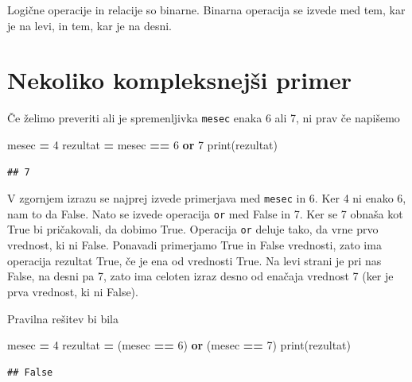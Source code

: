 \documentclass[
]{book}
\newenvironment{Shaded}{\begin{snugshade}}{\end{snugshade}}
\newcommand{\BuiltInTok}[1]{#1}
\newcommand{\DecValTok}[1]{\textcolor[rgb]{0.00,0.00,0.81}{#1}}
\newcommand{\KeywordTok}[1]{\textcolor[rgb]{0.13,0.29,0.53}{\textbf{#1}}}
\newcommand{\NormalTok}[1]{#1}
\newcommand{\OperatorTok}[1]{\textcolor[rgb]{0.81,0.36,0.00}{\textbf{#1}}}
\begin{document}
Logične operacije in relacije so binarne. Binarna operacija se izvede med tem,
kar je na levi, in tem, kar je na desni.

\hypertarget{nekoliko-kompleksnejux161i-primer}{%
\section{Nekoliko kompleksnejši primer}\label{nekoliko-kompleksnejux161i-primer}}

Če želimo preveriti ali je spremenljivka \texttt{mesec} enaka 6 ali 7, ni prav če napišemo

\begin{Shaded}
\begin{Highlighting}[]
\NormalTok{mesec }\OperatorTok{=} \DecValTok{4}
\NormalTok{rezultat }\OperatorTok{=}\NormalTok{ mesec }\OperatorTok{==} \DecValTok{6} \KeywordTok{or} \DecValTok{7}
\BuiltInTok{print}\NormalTok{(rezultat)}
\end{Highlighting}
\end{Shaded}

\begin{verbatim}
## 7
\end{verbatim}

V zgornjem izrazu se najprej izvede primerjava med \texttt{mesec} in 6. Ker 4 ni enako 6,
nam to da False. Nato se izvede operacija \texttt{or} med False in 7. Ker se 7 obnaša
kot True bi pričakovali, da dobimo True. Operacija \texttt{or} deluje tako, da vrne prvo
vrednost, ki ni False. Ponavadi primerjamo True in False vrednosti, zato ima
operacija rezultat True, če je ena od vrednosti True.
Na levi strani je pri nas False, na desni pa 7, zato ima celoten izraz desno
od enačaja vrednost 7 (ker je prva vrednost, ki ni False).

Pravilna rešitev bi bila

\begin{Shaded}
\begin{Highlighting}[]
\NormalTok{mesec }\OperatorTok{=} \DecValTok{4}
\NormalTok{rezultat }\OperatorTok{=}\NormalTok{ (mesec }\OperatorTok{==} \DecValTok{6}\NormalTok{) }\KeywordTok{or}\NormalTok{ (mesec }\OperatorTok{==} \DecValTok{7}\NormalTok{)}
\BuiltInTok{print}\NormalTok{(rezultat)}
\end{Highlighting}
\end{Shaded}

\begin{verbatim}
## False
\end{verbatim}
\end{document}
